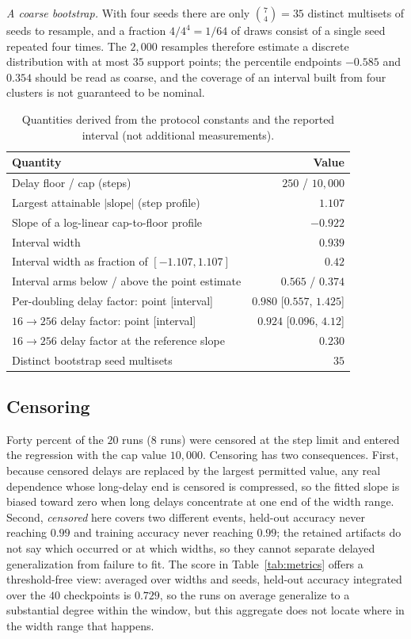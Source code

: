 \documentclass{article}
\begin{document}
\emph{A coarse bootstrap.} With four seeds there are only $\binom{7}{4}=35$ distinct multisets of seeds to resample, and a fraction $4/4^4=1/64$ of draws consist of a single seed repeated four times. The $2{,}000$ resamples therefore estimate a discrete distribution with at most $35$ support points; the percentile endpoints $-0.585$ and $0.354$ should be read as coarse, and the coverage of an interval built from four clusters is not guaranteed to be nominal.

\begin{table}[t]
\centering
\caption{Quantities derived from the protocol constants and the reported interval (not additional measurements).}
\label{tab:resolution}
\small
\begin{tabular}{lr}
\toprule
Quantity & Value \\
\midrule
Delay floor / cap (steps) & $250$ / $10{,}000$ \\
Largest attainable $|\text{slope}|$ (step profile) & $1.107$ \\
Slope of a log-linear cap-to-floor profile & $-0.922$ \\
Interval width & $0.939$ \\
Interval width as fraction of $[-1.107, 1.107]$ & $0.42$ \\
Interval arms below / above the point estimate & $0.565$ / $0.374$ \\
Per-doubling delay factor: point [interval] & $0.980$ [$0.557$, $1.425$] \\
$16\to256$ delay factor: point [interval] & $0.924$ [$0.096$, $4.12$] \\
$16\to256$ delay factor at the reference slope & $0.230$ \\
Distinct bootstrap seed multisets & $35$ \\
\bottomrule
\end{tabular}
\end{table}

\subsection{Censoring}
Forty percent of the $20$ runs ($8$ runs) were censored at the step limit and entered the regression with the cap value $10{,}000$. Censoring has two consequences. First, because censored delays are replaced by the largest permitted value, any real dependence whose long-delay end is censored is compressed, so the fitted slope is biased toward zero when long delays concentrate at one end of the width range. Second, \emph{censored} here covers two different events, held-out accuracy never reaching $0.99$ and training accuracy never reaching $0.99$; the retained artifacts do not say which occurred or at which widths, so they cannot separate delayed generalization from failure to fit. The score in Table~\ref{tab:metrics} offers a threshold-free view: averaged over widths and seeds, held-out accuracy integrated over the $40$ checkpoints is $0.729$, so the runs on average generalize to a substantial degree within the window, but this aggregate does not locate where in the width range that happens.
\end{document}
